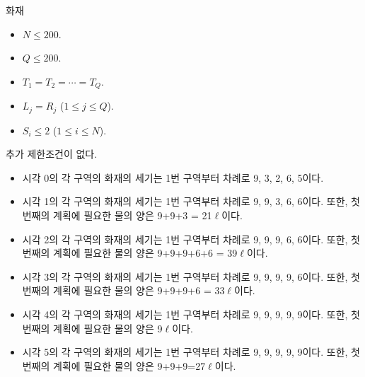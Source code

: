 \begin{problem}{화재}
\begin{itemize}
	\end{itemize}
	
	
	\begin{itemize}
		\item $N \le 200$.
		\item $Q \le 200$.
	\end{itemize}

	\begin{itemize}
		\item $T_1 = T_2 = \cdots = T_Q$.
	\end{itemize}

	\begin{itemize}
		\item $L_j = R_j$ ($1 \le j \le Q$).
			\end{itemize}


	\begin{itemize}
		\item $S_i \le 2$ ($1 \le i \le N$).
	\end{itemize}
	
	
	추가 제한조건이 없다.
	
	\Examples
		
	\begin{example}
	\end{example}

	\begin{itemize}
		\item 시각 0의 각 구역의 화재의 세기는 1번 구역부터 차례로 9, 3, 2, 6, 5이다.
		\item 시각 1의 각 구역의 화재의 세기는 1번 구역부터 차례로 9, 9, 3, 6, 6이다. 또한, 첫 번째의 계획에 필요한 물의 양은 9+9+3 = 21$\ell$이다.
		\item 시각 2의 각 구역의 화재의 세기는 1번 구역부터 차례로 9, 9, 9, 6, 6이다. 또한, 첫 번째의 계획에 필요한 물의 양은 9+9+9+6+6 = 39$\ell$이다.
		\item 시각 3의 각 구역의 화재의 세기는 1번 구역부터 차례로 9, 9, 9, 9, 6이다. 또한, 첫 번째의 계획에 필요한 물의 양은 9+9+9+6 = 33$\ell$이다.
		\item 시각 4의 각 구역의 화재의 세기는 1번 구역부터 차례로 9, 9, 9, 9, 9이다. 또한, 첫 번째의 계획에 필요한 물의 양은 9$\ell$이다.
		\item 시각 5의 각 구역의 화재의 세기는 1번 구역부터 차례로 9, 9, 9, 9, 9이다. 또한, 첫 번째의 계획에 필요한 물의 양은 9+9+9=27$\ell$이다.
	\end{itemize}


\end{problem}
